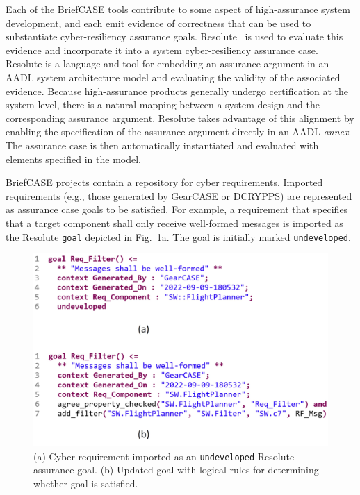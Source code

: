 Each of the BriefCASE tools contribute to some aspect of high-assurance system development, and each emit evidence of correctness that can be used to substantiate cyber-resiliency assurance goals. Resolute~\cite{resolute2014} is used to evaluate this evidence and incorporate it into a system cyber-resiliency assurance case. 
%
Resolute is a language and tool for embedding an assurance argument in an AADL system architecture model and evaluating the validity of the associated evidence. 
Because high-assurance products generally undergo certification at the system level, there is a natural mapping between a system design and the corresponding assurance argument. Resolute takes advantage of this alignment by enabling the specification of the assurance argument directly in an AADL \textit{annex}. The assurance case is then automatically instantiated and evaluated with elements specified in the model.

BriefCASE projects contain a repository for cyber requirements. Imported requirements (e.g., those generated by GearCASE or DCRYPPS) are represented as assurance case goals to be satisfied. 
For example, a requirement that specifies that a target component shall only receive well-formed messages is imported as the Resolute \texttt{goal} depicted in Fig.~\ref{fig:resolute-requirement}a.  The goal is initially marked \texttt{undeveloped}.

\begin{figure}[h] 
	\centering 
	\includegraphics[width=\columnwidth]{figs/resolute-requirement.jpg}
	\caption{(a) Cyber requirement imported as an \texttt{undeveloped} Resolute assurance goal.  (b) Updated goal with logical rules for determining whether goal is satisfied.}
	\label{fig:resolute-requirement} 
\end{figure}

